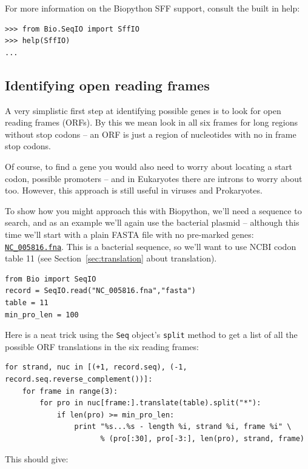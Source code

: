 \documentclass{report}
\begin{document}
For more information on the Biopython SFF support, consult the built in help:

\begin{verbatim}
>>> from Bio.SeqIO import SffIO
>>> help(SffIO)
...
\end{verbatim}

\subsection{Identifying open reading frames}

A very simplistic first step at identifying possible genes is to look for
open reading frames (ORFs).  By this we mean look in all six frames for long
regions without stop codons -- an ORF is just a region of nucleotides with
no in frame stop codons.

Of course, to find a gene you would also need to worry about locating a start
codon, possible promoters -- and in Eukaryotes there are introns to worry about
too.  However, this approach is still useful in viruses and Prokaryotes.

To show how you might approach this with Biopython, we'll need a sequence to
search, and as an example we'll again use the bacterial plasmid -- although
this time we'll start with a plain FASTA file with no pre-marked genes:
\href{http://biopython.org/SRC/biopython/Tests/GenBank/NC_005816.fna}
{\texttt{NC\_005816.fna}}. This is a bacterial sequence, so we'll want to use
NCBI codon table 11 (see Section~\ref{sec:translation} about translation).

\begin{verbatim}
from Bio import SeqIO 
record = SeqIO.read("NC_005816.fna","fasta")
table = 11
min_pro_len = 100
\end{verbatim}

Here is a neat trick using the \verb|Seq| object's \verb|split| method to
get a list of all the possible ORF translations in the six reading frames:

\begin{verbatim}
for strand, nuc in [(+1, record.seq), (-1, record.seq.reverse_complement())]:
    for frame in range(3):
        for pro in nuc[frame:].translate(table).split("*"):
            if len(pro) >= min_pro_len:
                print "%s...%s - length %i, strand %i, frame %i" \
                      % (pro[:30], pro[-3:], len(pro), strand, frame)
\end{verbatim}

\noindent This should give:
\end{document}
